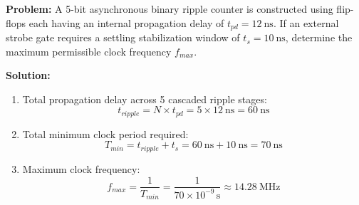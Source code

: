 \begin{examplebox}
\textbf{Problem:} A 5-bit asynchronous binary ripple counter is constructed using flip-flops each having an internal propagation delay of $t_{pd} = \SI{12}{\nano\second}$. If an external strobe gate requires a settling stabilization window of $t_s = \SI{10}{\nano\second}$, determine the maximum permissible clock frequency $f_{max}$.

\textbf{Solution:}
\begin{enumerate}
    \item Total propagation delay across 5 cascaded ripple stages:
    \begin{equation}
    t_{ripple} = N \times t_{pd} = 5 \times \SI{12}{\nano\second} = \SI{60}{\nano\second}
    \end{equation}
    \item Total minimum clock period required:
    \begin{equation}
    T_{min} = t_{ripple} + t_s = \SI{60}{\nano\second} + \SI{10}{\nano\second} = \SI{70}{\nano\second}
    \end{equation}
    \item Maximum clock frequency:
    \begin{equation}
    f_{max} = \frac{1}{T_{min}} = \frac{1}{70 \times 10^{-9}\,\text{s}} \approx \SI{14.28}{\mega\hertz}
    \end{equation}
\end{enumerate}
\end{examplebox}

